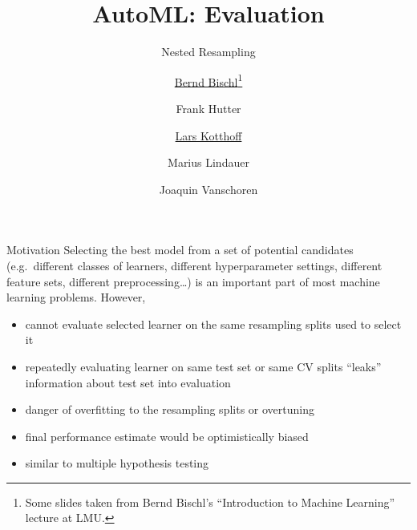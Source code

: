 




\title[AutoML: Risks]{AutoML: Evaluation} %
\subtitle{Nested Resampling} %
\author[Lars Kotthoff]{\underline{Bernd Bischl}\footnote{Some slides taken from Bernd Bischl's ``Introduction to Machine Learning'' lecture at LMU.  %
} \and Frank Hutter \and \underline{Lars Kotthoff}\newline \and Marius Lindauer \and Joaquin Vanschoren}
\institute{}
\date{}

\newcommand\reffootnote[1]{%
    \begingroup
    \renewcommand\thefootnote{}\footnote{
        \tiny #1
    \vspace*{1em}}%
    \addtocounter{footnote}{-1}%
    \endgroup
}



	
	\maketitle

    \begin{frame}[c]{Motivation}
    Selecting the best model from a set of potential candidates (e.g.\ different
    classes of learners, different hyperparameter settings, different feature
    sets, different preprocessing\ldots) is an important part of most  machine
    learning problems. However,

    \begin{itemize}
        \item cannot evaluate selected learner on the same
            resampling splits used to select it
        \item repeatedly evaluating learner on same test set or same CV splits
            ``leaks'' information about test set into evaluation
        \item danger of overfitting to the resampling splits or overtuning
        \item final performance estimate would be optimistically biased
        \item similar to multiple hypothesis testing
    \end{itemize}
    \end{frame}

